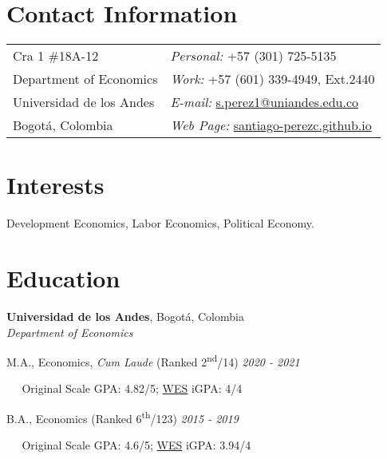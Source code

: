 \documentclass[margin,line]{res}
\newenvironment{list1}{
  \begin{list}{\ding{113}}{%
      \setlength{\itemsep}{0in}
      \setlength{\parsep}{0in} \setlength{\parskip}{0in}
      \setlength{\topsep}{0in} \setlength{\partopsep}{0in} 
      \setlength{\leftmargin}{0.17in}}}{\end{list}}
\begin{document}

\begin{resume}
\section{\sc Contact Information}
\vspace{.05in}
\begin{tabular}{@{}p{3in}p{3in}}
Cra 1 \#18A-12             & {\it Personal:} +57 (301) 725-5135 \\            
Department of Economics   & {\it Work:} +57 (601) 339-4949, Ext.2440  \\         
Universidad de los Andes & {\it E-mail:}  \href{mailto:s.perez1@uniandes.edu.co}{s.perez1@uniandes.edu.co}\\       
Bogotá, Colombia  & {\it Web Page:} \href{https://santiago-perezc.github.io}{santiago-perezc.github.io}  \\   
\end{tabular}


\section{\sc Interests}
Development Economics, Labor Economics, Political Economy.

\section{\sc Education}

{\bf Universidad de los Andes}, Bogotá, Colombia\\
{\em Department of Economics} \\
\begin{list1}

\item[]M.A., Economics, \textit{Cum Laude} (Ranked 2\textsuperscript{nd}/14) \hfill  {\it 2020  - 2021}
\item[]$\;\;\;\;\;$Original Scale GPA: 4.82/5; \href{https://applications.wes.org/igpa-calculator/}{WES} iGPA: 4/4 
\item[]
\item[] B.A., Economics (Ranked 6\textsuperscript{th}/123) \hfill {\it 2015 - 2019}
\item[]$\;\;\;\;\;$Original Scale GPA: 4.6/5; \href{https://applications.wes.org/igpa-calculator/}{WES} iGPA: 3.94/4 

\end{list1}


\end{resume}
\end{document}
